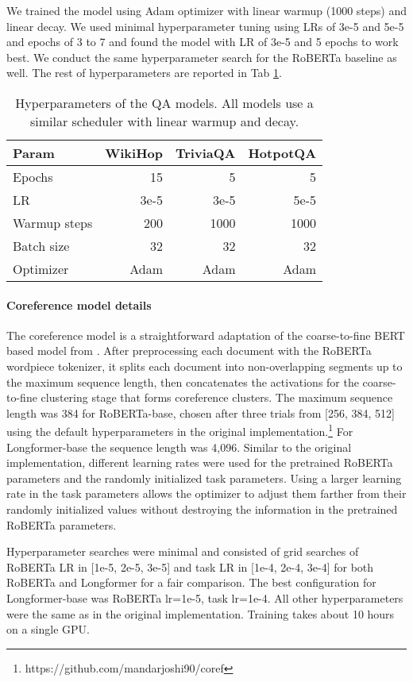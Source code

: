 \documentclass[11pt,a4paper]{article}
\newcommand{\model}{Longformer\xspace}
\begin{document}
We trained the model using Adam optimizer with linear warmup (1000 steps) and linear decay. We used minimal hyperparameter tuning using LRs of 3e-5 and 5e-5 and epochs of 3 to 7 and found the model with LR of 3e-5 and 5 epochs to work best. We conduct the same hyperparameter search for the RoBERTa baseline as well. The rest of hyperparameters are reported in Tab \ref{tab:qa-hyperparams}. 

\begin{table}[!h]
 \centering
 \small
\begin{tabular}{@{}lrrr@{}}
\toprule
Param & WikiHop & TriviaQA & HotpotQA \\
\midrule
Epochs & 15 & 5 & 5 \\
LR & 3e-5 & 3e-5 & 5e-5\\
Warmup steps & 200 & 1000 & 1000 \\
Batch size & 32 & 32 & 32 \\
Optimizer & Adam & Adam & Adam \\
\bottomrule
\end{tabular}
\caption{Hyperparameters of the QA models. All models use a similar scheduler with linear warmup and decay.}
\label{tab:qa-hyperparams}
 \end{table}


\paragraph{Coreference model details}
The coreference model is a straightforward adaptation of the coarse-to-fine BERT based model from \citet{joshi-etal-2019-bert}.  After preprocessing each document with the RoBERTa wordpiece tokenizer, it splits each document into non-overlapping segments up to the maximum sequence length, then concatenates the activations for the coarse-to-fine clustering stage that forms coreference clusters.
The maximum sequence length was 384 for RoBERTa-base, chosen after three trials from [256, 384, 512] using the default hyperparameters in the original  implementation.\footnote{https://github.com/mandarjoshi90/coref}  For \model-base the sequence length was 4,096.  Similar to the original implementation, different learning rates were used for the pretrained RoBERTa parameters and the randomly initialized task parameters.  Using a larger learning rate in the task parameters allows the optimizer to adjust them farther from their randomly initialized values without destroying the information in the pretrained RoBERTa parameters.  

Hyperparameter searches were minimal and consisted of grid searches of RoBERTa LR in [1e-5, 2e-5, 3e-5] and task LR in [1e-4, 2e-4, 3e-4] for both RoBERTa and \model for a fair comparison. The best configuration for \model-base was RoBERTa lr=1e-5, task lr=1e-4.  All other hyperparameters were the same as in the original implementation.  Training takes about 10 hours on a single GPU.
\end{document}
